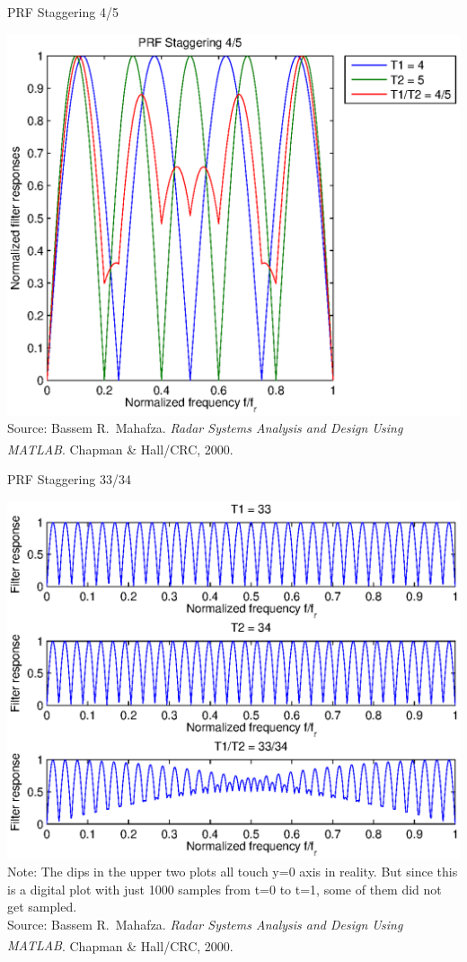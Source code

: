 \documentclass[mathserif]{beamer}
\begin{document}
    
    \begin{frame}{PRF Staggering 4/5}
      \begin{minipage}[t][0.8\textheight][t]{\textwidth}
	\centering
	\includegraphics[width=0.8\linewidth]{prfStaggering4_5} \\
	\vfill
	\tiny{Source: Bassem R.~Mahafza. \emph{Radar Systems Analysis and Design Using MATLAB\textsuperscript{\textregistered}}. Chapman \& Hall/CRC, 2000.}
      \end{minipage}
    \end{frame}
    
    
    \begin{frame}{PRF Staggering 33/34}
      \begin{minipage}[t][0.8\textheight][t]{\textwidth}
	\centering
	\includegraphics[width=0.7\linewidth]{prfStaggering33_34} \\
	\vfill
	\tiny{Note: The dips in the upper two plots all touch y=0 axis in reality. But since this is a digital plot with just 1000 samples from t=0 to t=1, some of them did not get sampled.} \\
	\tiny{Source: Bassem R.~Mahafza. \emph{Radar Systems Analysis and Design Using MATLAB\textsuperscript{\textregistered}}. Chapman \& Hall/CRC, 2000.}
      \end{minipage}
    \end{frame}
    
\end{document}
